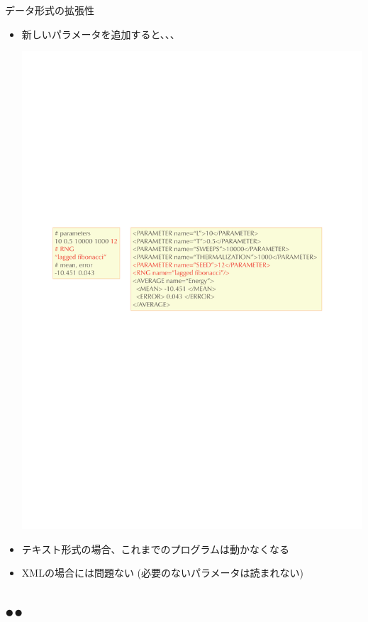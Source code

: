 \begin{frame}{データ形式の拡張性}
  \begin{itemize}
  \item 新しいパラメータを追加すると、、、
  \begin{center}
    \includegraphics[width=.8\textwidth]{xml4.pdf}
  \end{center}
  \item テキスト形式の場合、これまでのプログラムは動かなくなる
  \item XMLの場合には問題ない (必要のないパラメータは読まれない)
  \end{itemize}
\end{frame}

\subsection*{{\protect\color{red}●}{\protect\color{blue}●}}

